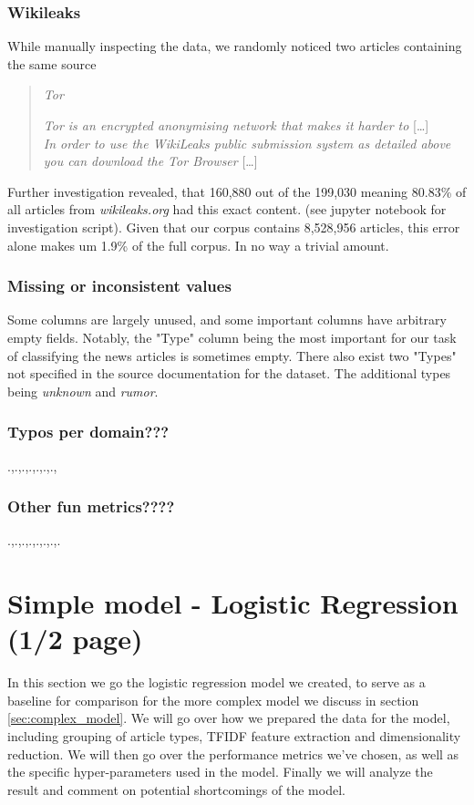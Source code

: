 \documentclass{article}
\begin{document}
\subsubsection{Wikileaks}
While manually inspecting the data, we randomly noticed two articles containing the same source
\begin{quote}
    \textit{Tor}

    \textit{Tor is an encrypted anonymising network that makes it harder to} [\dots]\\
    \textit{In order to use the WikiLeaks public submission system as detailed above you can download the Tor Browser} [\dots]
\end{quote}
Further investigation revealed, that 160,880 out of the 199,030 meaning 80.83\% of all articles from \emph{wikileaks.org} had this exact content. (see jupyter notebook for investigation script). Given that our corpus contains 8,528,956 articles, this error alone makes um 1.9\% of the full corpus. In no way a trivial amount.
\subsubsection{Missing or inconsistent values}
Some columns are largely unused, and some important columns have arbitrary empty fields. Notably, the "Type" column being the most important for our task of classifying the news articles is sometimes empty. There also exist two "Types" not specified in the source documentation for the dataset. The additional types being \emph{unknown} and \emph{rumor}.
\subsubsection{Typos per domain???}
.,.,.,.,.,.,.,
\subsubsection{Other fun metrics????}
.,.,.,.,.,.,.,.
\newpage

\section{Simple model - Logistic Regression (1/2 page)} 
In this section we go the logistic regression model we created, to serve as a baseline for comparison for the more
complex model we discuss in section \ref{sec:complex_model}. We will go over how we prepared the data for the model,
including grouping of article types, TFIDF feature extraction and dimensionality reduction. We will then go over the
performance metrics we've chosen, as well as the specific hyper-parameters used in the model. Finally we will analyze
the result and comment on potential shortcomings of the model. 
\end{document}
